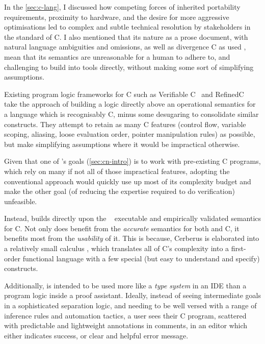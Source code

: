 In the \cref{sec:c-lang}, I discussed how competing forces of inherited
portability requirements, proximity to hardware, and the desire for more
aggressive optimisations led to complex and subtle technical resolution by
stakeholders in the  standard of C. I also mentioned that its nature as
a prose document, with natural language ambiguities and omissions, as well as
divergence C as used , mean that its semantics are unreasonable
for a human to adhere to, and challenging to build into tools directly,
without making some sort of simplifying assumptions.

Existing program logic frameworks for C such as Verifiable C~
and RefinedC~ take the approach of building a
logic directly above an operational semantics for a language which is
recognisably C, minus some desugaring to consolidate similar constructs. They
attempt to retain as many C features (control flow, variable scoping, aliasing,
loose evaluation order, pointer manipulation rules) as possible, but make
simplifying assumptions where it would be impractical otherwise.

Given that one of 's goals (\cref{sec:cn-intro}) is to work with
pre-existing C programs, which rely on many if not all of those impractical
features, adopting the conventional approach would quickly use up most of its
complexity budget and make the other goal (of reducing the expertise required
to do verification) unfeasible.

Instead,  builds directly upon the
~ executable and empirically
validated semantics for C. Not only does  benefit from the
\emph{accurate} semantics for both  and  C, it benefits
most from the \emph{usability} of it. This is because, Cerberus is elaborated
into a relatively small calculus \emph{}, which translates all of C's
complexity into a first-order functional language with a few special (but easy
to understand and specify) constructs.

Additionally,  is intended to be used more like a \emph{type system} in
an IDE than a program logic inside a proof assistant. Ideally, instead of
seeing intermediate goals in a sophisticated separation logic, and needing to
be well versed with a range of inference rules and automation tactics, a user
sees their C program, scattered with predictable and lightweight annotations in
comments, in an editor which either indicates success, or clear and helpful
error message.

